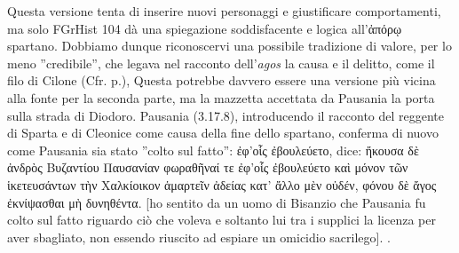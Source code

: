 {            Questa versione tenta di inserire nuovi personaggi e giustificare comportamenti, ma solo FGrHist 104 dà una spiegazione soddisfacente e logica all'\textgreek{ἀπόρῳ} spartano. Dobbiamo dunque riconoscervi una possibile tradizione di valore, per lo meno ''credibile'', che legava nel racconto dell'\emph{agos} la causa e il delitto, come il filo di Cilone  (Cfr. p.\pageref{Ilsacrilegiociloniano}), Questa potrebbe davvero essere una versione più vicina alla fonte per la seconda parte, ma la mazzetta accettata da Pausania  la porta sulla strada di Diodoro. Pausania (3.17.8), introducendo il racconto del reggente di Sparta e di Cleonice come causa della fine dello spartano, conferma di nuovo come Pausania  sia stato ''colto sul fatto'': \textgreek{ἐφ’οἷς ἐβουλεύετο, dice: ἤκουσα δὲ ἀνδρὸς Βυζαντίου Παυσανίαν φωραθῆναί τε ἐφ’οἷς ἐβουλεύετο καὶ μόνον τῶν ἱκετευσάντων τὴν Χαλκίοικον ἁμαρτεῖν ἀδείας κατ’ ἄλλο μὲν οὐδέν, φόνου δὲ ἄγος ἐκνίψασθαι μὴ δυνηθέντα.} [ho sentito da un uomo di Bisanzio che Pausania  fu colto sul fatto riguardo ciò che voleva e soltanto lui tra i supplici la licenza per aver sbagliato, non essendo riuscito ad espiare un omicidio sacrilego]. \cite[XXIVs]{ Musti1982}.
}
